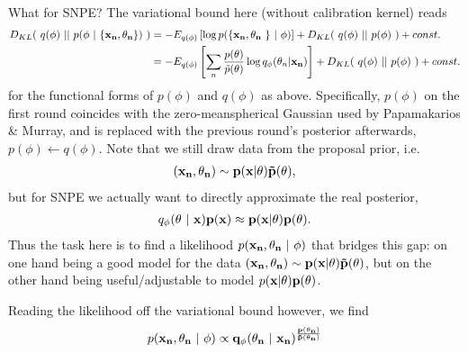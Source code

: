 \documentclass[10pt,english]{article}
\begin{document}
\noindent{}What for SNPE? The variational bound here (without calibration kernel) reads 
\begin{align}
D_{KL}( \ q(\phi) \ || \ p(\phi \ | \ \{\bf{x}_n, \theta_n\}) \ ) &= - E_{q(\phi)}\left[ \log p( \{ \bf{x}_n, \theta_n \ \} \ | \ \phi) \right]  + D_{KL}( \ q(\phi) \ || \ p(\phi) \ )  + const. \nonumber \\
&= - E_{q(\phi)}\left[ \sum_n \frac{p(\theta)}{\tilde{p}(\theta)}\log q_\phi( \theta_n | \bf{x}_n) \right]  + D_{KL}( \ q(\phi) \ || \ p(\phi) \ )  + const. \nonumber
\end{align}
for the functional forms of $p(\phi)$ and $q(\phi)$ as above.
Specifically, $p(\phi)$ on the first round coincides with the zero-meanspherical Gaussian used by Papamakarios \& Murray, and is replaced with the previous round's posterior afterwards, $p(\phi) \leftarrow q(\phi)$.
Note that we still draw data from the proposal prior, i.e.
\begin{align}
(\bf{x}_n, \theta_n) \sim p(x|\theta)\tilde{p}(\theta),\nonumber
\end{align} 
but for SNPE we actually want to directly approximate the real posterior,
\begin{align}
q_\phi(\theta \ | \ \bf{x}) p(\bf{x}) \approx p(x |\theta) p(\theta). \nonumber
\end{align}
Thus the task here is to find a likelihood $p( \bf{x}_n, \theta_n \ | \ \phi)$ that bridges this gap: 
on one hand being a good model for the data $(\bf{x}_n, \theta_n) \sim p(\bf{x}|\theta)\tilde{p}(\theta)$, but on the other hand being useful/adjustable to model $p(\bf{x} |\theta) p(\theta)$.

Reading the likelihood off the variational bound however, we find
\begin{align}
p( \bf{x}_n, \theta_n \ | \ \phi) \propto q_\phi(\theta_n \ | \ \bf{x}_n)^\frac{p(\theta_n)}{\tilde{p}(\theta_n)}
\label{eq:SNPE_likelihood}
\end{align}
\end{document}
